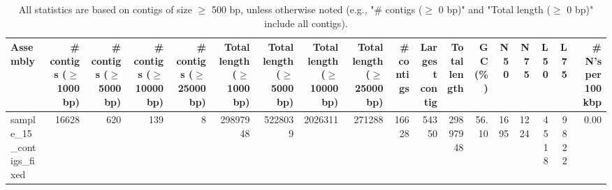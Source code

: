 \documentclass[12pt,a4paper]{article}
\begin{document}
\begin{table}[ht]
\begin{center}
\caption{All statistics are based on contigs of size $\geq$ 500 bp, unless otherwise noted (e.g., "\# contigs ($\geq$ 0 bp)" and "Total length ($\geq$ 0 bp)" include all contigs).}
\begin{tabular}{|l*{17}{|r}|}
\hline
Assembly & \# contigs ($\geq$ 1000 bp) & \# contigs ($\geq$ 5000 bp) & \# contigs ($\geq$ 10000 bp) & \# contigs ($\geq$ 25000 bp) & Total length ($\geq$ 1000 bp) & Total length ($\geq$ 5000 bp) & Total length ($\geq$ 10000 bp) & Total length ($\geq$ 25000 bp) & \# contigs & Largest contig & Total length & GC (\%) & N50 & N75 & L50 & L75 & \# N's per 100 kbp \\ \hline
sample\_15\_contigs\_fixed & 16628 & 620 & 139 & 8 & 29897948 & 5228039 & 2026311 & 271288 & 16628 & 54350 & 29897948 & 56.10 & 1695 & 1224 & 4518 & 9822 & 0.00 \\ \hline
\end{tabular}
\end{center}
\end{table}
\end{document}
